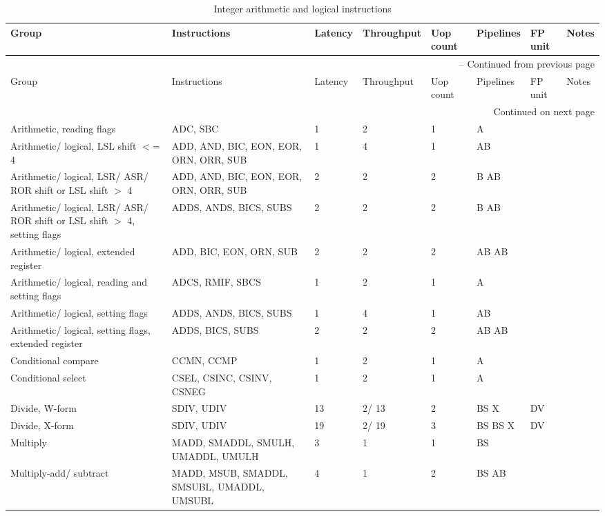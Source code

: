 \begin{longtable}{|p{1in}|p{1in}|l|l|l|p{1in}|l|p{1in}|}
\caption{Integer arithmetic and logical instructions} \\
\hline
Group & Instructions & Latency & Throughput & Uop count & Pipelines & FP unit & Notes\\
\hline
\endfirsthead
\hline
\multicolumn{8}{|r|}{{\tablename\ \thetable{} -- Continued from previous page}} \\
\hline
Group & Instructions & Latency & Throughput & Uop count & Pipelines & FP unit & Notes\\
\hline
\endhead
\hline
\multicolumn{8}{|r|}{{Continued on next page}} \\
\hline
\endfoot
\hline
\endlastfoot
Arithmetic, reading flags & ADC, SBC & 1 & 2 & 1 & A &  & \\
\hline
Arithmetic/ logical, LSL shift $<$= 4 & ADD, AND, BIC, EON, EOR, ORN, ORR, SUB & 1 & 4 & 1 & AB &  & \\
\hline
Arithmetic/ logical, LSR/ ASR/ ROR shift or LSL shift $>$ 4 & ADD, AND, BIC, EON, EOR, ORN, ORR, SUB & 2 & 2 & 2 & B AB &  & \\
\hline
Arithmetic/ logical, LSR/ ASR/ ROR shift or LSL shift $>$ 4, setting flags & ADDS, ANDS, BICS, SUBS & 2 & 2 & 2 & B AB &  & \\
\hline
Arithmetic/ logical, extended register & ADD, BIC, EON, ORN, SUB & 2 & 2 & 2 & AB AB &  & \\
\hline
Arithmetic/ logical, reading and setting flags & ADCS, RMIF, SBCS & 1 & 2 & 1 & A &  & \\
\hline
Arithmetic/ logical, setting flags & ADDS, ANDS, BICS, SUBS & 1 & 4 & 1 & AB &  & \\
\hline
Arithmetic/ logical, setting flags, extended register & ADDS, BICS, SUBS & 2 & 2 & 2 & AB AB &  & \\
\hline
Conditional compare & CCMN, CCMP & 1 & 2 & 1 & A &  & \\
\hline
Conditional select & CSEL, CSINC, CSINV, CSNEG & 1 & 2 & 1 & A &  & \\
\hline
Divide, W-form & SDIV, UDIV & 13 & 2/ 13 & 2 & BS X & DV & \\
\hline
Divide, X-form & SDIV, UDIV & 19 & 2/ 19 & 3 & BS BS X & DV & \\
\hline
Multiply & MADD, SMADDL, SMULH, UMADDL, UMULH & 3 & 1 & 1 & BS &  & \\
\hline
Multiply-add/ subtract & MADD, MSUB, SMADDL, SMSUBL, UMADDL, UMSUBL & 4 & 1 & 2 & BS AB &  & \\
\hline
\end{longtable}
